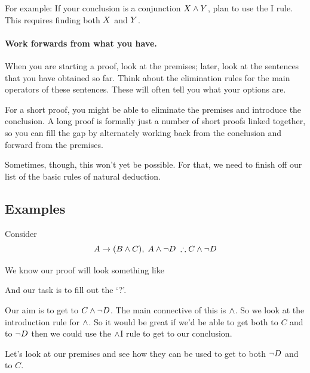 For example: If your conclusion is a conjunction $X\mathbin{\wedge}Y$, plan to use the {\eand}I rule. This requires finding both $X$ and $Y$.

\paragraph{Work forwards from what you have.}
When you are starting a proof, look at the premises; later, look at the sentences that you have obtained so far. Think about the elimination rules for the main operators of these sentences. These will often tell you what your options are.

For a short proof, you might be able to eliminate the premises and introduce the conclusion. A long proof is formally just a number of short proofs linked together, so you can fill the gap by alternately working back from the conclusion and forward from the premises.

Sometimes, though, this won't yet be possible. For that, we need to finish off our list of the basic rules of natural deduction.

\subsection{Examples}


Consider $$A\eif( B\eand C),\; A\eand \enot D\; \therefore C\eand \enot  D$$

We know our proof will look something like 
\begin{fitchproof}
	 
\end{fitchproof}
And our task is to fill out the `?'. 


Our aim is to get to $C\mathbin{\wedge} \neg  D$. The main connective of this is $\mathbin{\wedge}$. So we look at the introduction rule for $\mathbin{\wedge}$. So it would be great if we'd be able to get both to $C$ and to $\neg D$ then we could use the $\mathbin{\wedge}$I rule to get to our conclusion. 
\begin{fitchproof}
	 
\end{fitchproof}

Let's look at our premises and see how they can be used to get to both $\neg D$ and to $C$. 


